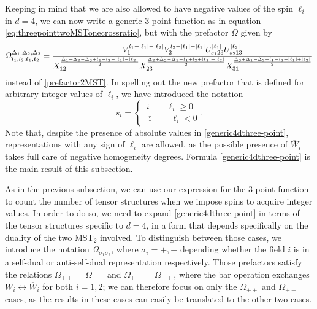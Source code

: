 \documentclass{article}
\begin{document}
Keeping in mind that we are also allowed to have negative values of the 
spin $\ell_i$ in $d=4$, we can now write a generic 3-point function as in equation 
\eqref{eq:threepointtwoMSTonecrossratio}, but with the prefactor $\Omega$ given 
by 
\begin{equation}
    \Omega^{\Delta_1,\Delta_2,\Delta_3}_{l_1,l_2;\ell_1,\ell_2} =
    \frac{V_1^{l_1-\abs{\ell_1}-\abs{\ell_2}}V_2^{l_2-\abs{\ell_1}-\abs{\ell_2}}
    U_{s_123}^{\abs{\ell_1}}U_{s_213}^{\abs{\ell_2}}}
    {X_{12}^{\frac{\Delta_1+\Delta_2-\Delta_3+l_1+l_2-\abs{\ell_1}-\abs{\ell_2}}{2}}
    X_{23}^{\frac{\Delta_2+\Delta_3-\Delta_1-l_1+l_2+\abs{\ell_1}+\abs{\ell_2}}{2}}
    X_{31}^{\frac{\Delta_3+\Delta_1-\Delta_2+l_1-l_2+\abs{\ell_1}+\abs{\ell_2}}{2}}}
    \label{generic4dthree-point}
\end{equation}
instead of \eqref{prefactor2MST}. In spelling out the new prefactor that is 
defined for arbitrary integer values of $\ell_i$, we have introduced the notation
\begin{equation}
    s_i=\begin{cases}
    \,i \qquad \ell_i\ge 0\\
    \,\bar{\imath} \qquad \ell_i<0
    \end{cases}.
\end{equation}
Note that, despite the presence of absolute values in \eqref{generic4dthree-point},
representations with any sign of $\ell_i$ are allowed, as the possible presence of
$\overline{W}_i$ takes full care of negative homogeneity degrees. Formula 
\eqref{generic4dthree-point} is the main result of this subsection. 
\smallskip 

As in the previous subsection, we can use our expression for the 3-point function to count the number of tensor structures when we impose spins to acquire 
integer values. In order to do so, we need to expand \eqref{generic4dthree-point} in terms of the tensor structures specific to $d=4$, in a form that depends specifically on the duality of the two MST$_2$ involved. To distinguish between those cases, we introduce the notation $\Omega_{\sigma_1 \sigma_2}$, where $\sigma_i=+,-$ depending whether the field $i$ is in a self-dual or anti-self-dual representation respectively. Those prefactors satisfy the relations $\Omega_{++}=\overline{\Omega}_{--}$ and $\Omega_{+-}=\overline{\Omega}_{-+}$, where the bar operation exchanges $W_i\leftrightarrow \overline{W}_i$ for both $i=1,2$; we can therefore focus on only the $\Omega_{++}$ and $\Omega_{+-}$ cases, as the results in these cases can easily be translated to the other two cases.
\end{document}
